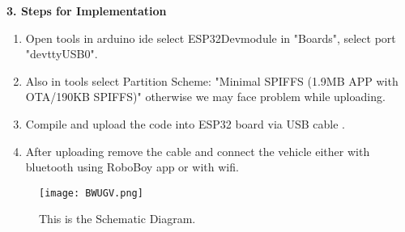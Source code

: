 \documentclass[12pt]{article}
\begin{document}
\begin{multicols}{2}
\vspace{1em}
\noindent\textbf{3. Steps for Implementation}
\begin{enumerate}
    \item Open tools in arduino ide select ESP32Devmodule in "Boards", select port "devttyUSB0".
    \item Also in tools select Partition Scheme: "Minimal SPIFFS (1.9MB APP with OTA/190KB SPIFFS)" otherwise we may face problem while uploading.
    \item Compile and upload the code into ESP32 board via USB cable .
    \item After uploading remove the cable and connect the vehicle either with bluetooth using RoboBoy app or with wifi.
\end{enumerate}

\vspace{1em}

\end{multicols}
\vspace{4em}
\vspace{1em}
\begin{figure}[H]
    \centering
    \texttt{[image: BWUGV.png]}
    \caption{This is the Schematic Diagram.}
    \label{fig:image1}
\end{figure}
\end{document}
